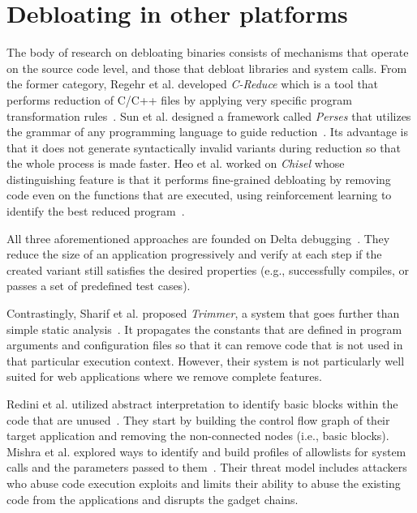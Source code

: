 \section{Debloating in other platforms}

The body of research on debloating binaries consists of mechanisms that operate on the source code level, and those that debloat libraries and system calls. 
From the former category, Regehr et al. developed \textit{C-Reduce} which is a tool that performs reduction of C/C++ files by applying very specific program transformation rules~\cite{regehr2012CReduce}.
Sun et al. designed a framework called \textit{Perses} that utilizes the grammar of any programming language to guide reduction~\cite{sun2018perses}.
Its advantage is that it does not generate syntactically invalid variants during reduction so that the whole process is made faster.
Heo et al. worked on \textit{Chisel} whose distinguishing feature is that it performs fine-grained debloating by removing code even on the functions that are executed, using reinforcement learning to identify the best reduced program~\cite{heo2018effective}.

All three aforementioned approaches are founded on Delta debugging~\cite{zeller2002Delta}.
They reduce the size of an application progressively and verify at each step if the created variant still satisfies the desired properties (e.g., successfully compiles, or passes a set of predefined test cases).

Contrastingly, Sharif et al. proposed \textit{Trimmer}, a system that goes further than simple static analysis~\cite{sharif2018Trimmer}.
It propagates the constants that are defined in program arguments and configuration files so that it can remove code that is not used in that particular execution context.
However, their system is not particularly well suited for web applications where we remove complete features.

Redini et al. utilized abstract interpretation to identify basic blocks within the code that are unused~\cite{redini2019b}. 
They start by building the control flow graph of their target application and removing the non-connected nodes (i.e., basic blocks). 
Mishra et al. explored ways to identify and build profiles of allowlists for system calls and the parameters passed to them~\cite{mishra2018shredder,mishra2020saffire}. 
Their threat model includes attackers who abuse code execution exploits and limits their ability to abuse the existing code from the applications and disrupts the gadget chains. 


